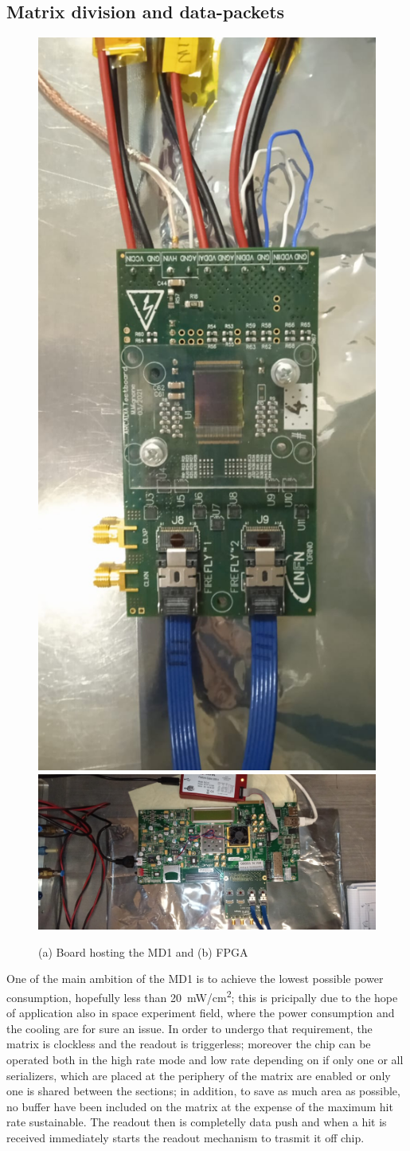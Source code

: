     \subsection{Matrix division and data-packets}
    \begin{figure}[h!]
        \centering
        \includegraphics[width=.3\linewidth, angle =90 ]{figures/ARCADIA/arcadia_chip_front.jpeg}\\
        \includegraphics[width=.7\linewidth]{figures/ARCADIA/arcadia_FPGA.jpeg}
        \caption{(a) Board hosting the MD1 and (b) FPGA}
        \label{fig:}
    \end{figure}
    One of the main ambition of the MD1 is to achieve the lowest possible power consumption, hopefully less than \SI{20}{mW/cm\squared}; this is pricipally due to the hope of application also in space experiment field, where the power consumption and the cooling are for sure an issue. 
    In order to undergo that requirement, the matrix is clockless and the readout is triggerless; moreover the chip can be operated both in the high rate mode and low rate depending on if only one or all serializers, which are placed at the periphery of the matrix are enabled or only one is shared between the sections; in addition, to save as much area as possible, no buffer have been included on the matrix at the expense of the maximum hit rate sustainable. The readout then is completelly data push and when a hit is received immediately starts the readout mechanism to trasmit it off chip.

